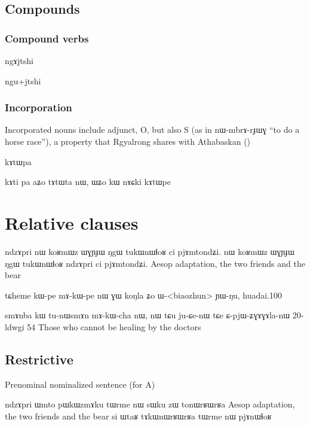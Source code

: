 \documentclass[oldfontcommands,oneside,a4paper,11pt]{memoir}
\newcommand{\ipa}[1]{{\phon #1}} %
\newcommand{\wav}[1]{}%
\begin{document}
\section{Compounds} \label{sec:verbal.composition}

\subsection{Compound verbs}

ngɤjtshi

ngu+jtshi
\subsection{Incorporation} \label{sub:incorporation}
Incorporated nouns include adjunct, O, but also S (as in \ipa{nɯ-mbrɤ-rɟɯɣ} ``to do a horse race''), a property that Rgyalrong shares with Athabaskan (\citet[215]{rice2000scope})
 
kɤtɯpa

kɤti pa
 aʑo tɤtɯta nɯ, ɯʑo kɯ nɤɕki kɤtɯpe \wav{kAtWpa}
\chapter{Relative clauses} \label{chapt:relative}



%

ndzɤpri nɯ koʁmɯz ɯɣɲɟɯ ŋgɯ tukɯnɯɬoʁ ci pjɤmtondʑi. 
 nɯ koʁmɯz ɯɣɲɟɯ ŋgɯ tukɯnɯɬoʁ ndzɤpri ci pjɤmtondʑi. 
Aesop adaptation, the two friends and the bear

tɕheme	kɯ-pe	mɤ-kɯ-pe	nɯ	ɣɯ	koŋla	ʑo	ɯ-<biaozhun>	ɲɯ-ŋu,
huadai.100


smɤnba kɯ tu-nɯsmɤn mɤ-kɯ-cha nɯ, nɯ tɕu ju-ɕe-nɯ tɕe ɕ-pjɯ-ʑɣɤɣɤla-nɯ
20-ldwgi 54
Those who cannot be healing by the doctors
\section{Restrictive}
Prenominal nominalized sentence (for A)

ndzɤpri ɯmto pɯkɯzmɤku tɯrme nɯ sɯku zɯ tonɯrʁɯrʁa
Aesop adaptation, the two friends and the bear
 si ɯtaʁ tɤkɯnɯrʁɯrʁa tɯrme nɯ pjɤnɯɬoʁ
 
\end{document}
